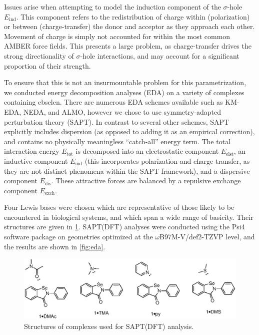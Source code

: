 \begin{refsection}
Issues arise when attempting to model the induction component of the $\sigma$-hole $E_{\mathrm{ind}}$.
This component refers to the redistribution of charge within (polarization) or between (charge-transfer) the donor and acceptor as they approach each other.
Movement of charge is simply not accounted for within the most common AMBER force fields.
This presents a large problem, as charge-transfer drives the strong directionality of $\sigma$-hole interactions, and may account for a significant proportion of their strength.

To ensure that this is not an insurmountable problem for this parametrization, we conducted energy decomposition analyses (EDA) on a variety of complexes containing ebselen.
There are numerous EDA schemes available such as KM-EDA, NEDA, and ALMO, however we chose to use symmetry-adapted perturbation theory (SAPT).\autocite{SAPT2020,Jeziorski1994PerturbationComplexes}
In contrast to several other schemes, SAPT explicitly includes dispersion (as opposed to adding it as an empirical correction), and contains no physically meaningless ``catch-all'' energy term.
The total interaction energy $E_\mathrm{tot}$ is decomposed into an electrostatic component $E_\mathrm{elst}$, an inductive component $E_\mathrm{ind}$ (this incorporates polarization and charge transfer, as they are not distinct phenomena within the SAPT framework), and a dispersive component $E_\mathrm{dis}$.
These attractive forces are balanced by a repulsive exchange component $E_\mathrm{exch}$.

Four Lewis bases were chosen which are representative of those likely to be encountered in biological systems, and which span a wide range of basicity.
Their structures are given in \cref{fig:complexes}.
SAPT(DFT) analyses were conducted using the Psi4 software package on geometries optimized at the $\omega$B97M-V/def2-TZVP level, and the results are shown in \cref{fig:eda}.\autocite{Parrish2017}

\begin{figure}
    \centering
    \includegraphics[scale=0.74]{Figures/sapt-complexes.eps}
    \caption{Structures of complexes used for SAPT(DFT) analysis.}
    \label{fig:complexes}
\end{figure}


\end{refsection}
